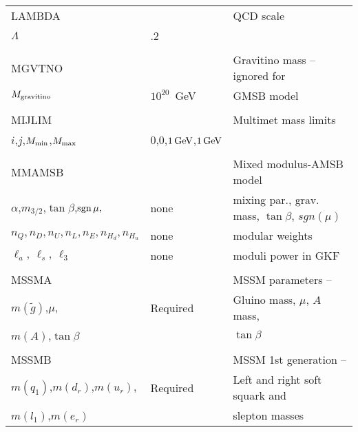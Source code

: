 \newpage
\begin{center}
\begin{tabular}{lll}
\hline\hline
LAMBDA                 &                   & QCD scale                      \\
$\Lambda$              & .2                &                                \\
                       &                   &                                \\
MGVTNO                 &                   & Gravitino mass -- ignored for  \\
$M_{\rm gravitino}$    & $10^{20}$~GeV     & GMSB model                     \\
                       &                   &                                \\
MIJLIM                 &                   & Multimet mass limits           \\
$i$,$j$,$M_{\rm min}$,$M_{\rm max}$ & 0,0,$1\,{\rm GeV}$,$1\,{\rm GeV}$ &             \\
                       &                   &                                \\
MMAMSB                 &                   & Mixed modulus-AMSB model       \\
$\alpha$,$m_{3/2}$,$\tan\beta$,$\mathop{\rm sgn}\mu ,$ & none & mixing par., 
grav. mass, $\tan\beta$, $sgn(\mu )$ \\
$n_Q,n_D,n_U,n_L,n_E,n_{H_d},n_{H_u}$  & none  & modular weights            \\
$\ell_a,\ \ell_s,\ \ell_3$ & none  & moduli power in GKF                    \\
                       &                   &                                \\
MSSMA                  &                   & MSSM parameters --             \\
$m(\tilde g)$,$\mu$,   & Required          & Gluino mass, $\mu$, $A$ mass,  \\
$m(A)$,$\tan\beta$     &                   & $\tan\beta$                    \\
                       &                   &                                \\
MSSMB                  &                   & MSSM 1st generation --         \\
$m(q_1)$,$m(d_r)$,$m(u_r)$, & Required     & Left and right soft squark and \\
$m(l_1)$,$m(e_r)$      &                   & slepton masses                 \\

\end{tabular}
\end{center}
